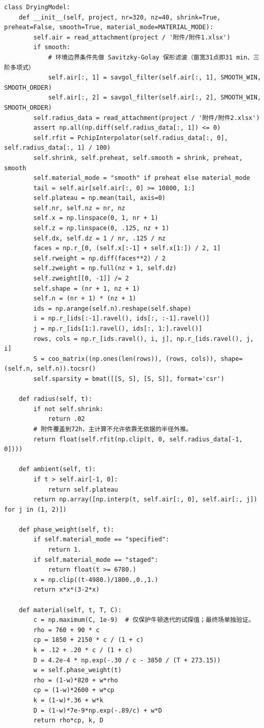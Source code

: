 \documentclass[12pt,a4paper]{ctexart}
\begin{document}
\begin{lstlisting}[caption={solve\_problem4.py }]
class DryingModel:
    def __init__(self, project, nr=320, nz=40, shrink=True, preheat=False, smooth=True, material_mode=MATERIAL_MODE):
        self.air = read_attachment(project / '附件/附件1.xlsx')
        if smooth:
            # 环境边界条件先做 Savitzky-Golay 保形滤波（窗宽31点即31 min、三阶多项式）
            self.air[:, 1] = savgol_filter(self.air[:, 1], SMOOTH_WIN, SMOOTH_ORDER)
            self.air[:, 2] = savgol_filter(self.air[:, 2], SMOOTH_WIN, SMOOTH_ORDER)
        self.radius_data = read_attachment(project / '附件/附件2.xlsx')
        assert np.all(np.diff(self.radius_data[:, 1]) <= 0)
        self.rfit = PchipInterpolator(self.radius_data[:, 0], self.radius_data[:, 1] / 100)
        self.shrink, self.preheat, self.smooth = shrink, preheat, smooth
        self.material_mode = "smooth" if preheat else material_mode
        tail = self.air[self.air[:, 0] >= 10800, 1:]
        self.plateau = np.mean(tail, axis=0)
        self.nr, self.nz = nr, nz
        self.x = np.linspace(0, 1, nr + 1)
        self.z = np.linspace(0, .125, nz + 1)
        self.dx, self.dz = 1 / nr, .125 / nz
        faces = np.r_[0, (self.x[:-1] + self.x[1:]) / 2, 1]
        self.rweight = np.diff(faces**2) / 2
        self.zweight = np.full(nz + 1, self.dz)
        self.zweight[[0, -1]] /= 2
        self.shape = (nr + 1, nz + 1)
        self.n = (nr + 1) * (nz + 1)
        ids = np.arange(self.n).reshape(self.shape)
        i = np.r_[ids[:-1].ravel(), ids[:, :-1].ravel()]
        j = np.r_[ids[1:].ravel(), ids[:, 1:].ravel()]
        rows, cols = np.r_[ids.ravel(), i, j], np.r_[ids.ravel(), j, i]
        S = coo_matrix((np.ones(len(rows)), (rows, cols)), shape=(self.n, self.n)).tocsr()
        self.sparsity = bmat([[S, S], [S, S]], format='csr')

    def radius(self, t):
        if not self.shrink:
            return .02
        # 附件覆盖到72h，主计算不允许依靠无依据的半径外推。
        return float(self.rfit(np.clip(t, 0, self.radius_data[-1, 0])))

    def ambient(self, t):
        if t > self.air[-1, 0]:
            return self.plateau
        return np.array([np.interp(t, self.air[:, 0], self.air[:, j]) for j in (1, 2)])

    def phase_weight(self, t):
        if self.material_mode == "specified":
            return 1.
        if self.material_mode == "staged":
            return float(t >= 6780.)
        x = np.clip((t-4980.)/1800.,0.,1.)
        return x*x*(3-2*x)

    def material(self, t, T, C):
        c = np.maximum(C, 1e-9)  # 仅保护牛顿迭代的试探值；最终场单独验证。
        rho = 760 + 90 * c
        cp = 1850 + 2150 * c / (1 + c)
        k = .12 + .20 * c / (1 + c)
        D = 4.2e-4 * np.exp(-.30 / c - 3850 / (T + 273.15))
        w = self.phase_weight(t)
        rho = (1-w)*820 + w*rho
        cp = (1-w)*2600 + w*cp
        k = (1-w)*.36 + w*k
        D = (1-w)*7e-9*np.exp(-.89/c) + w*D
        return rho*cp, k, D


\end{lstlisting}
\end{document}
